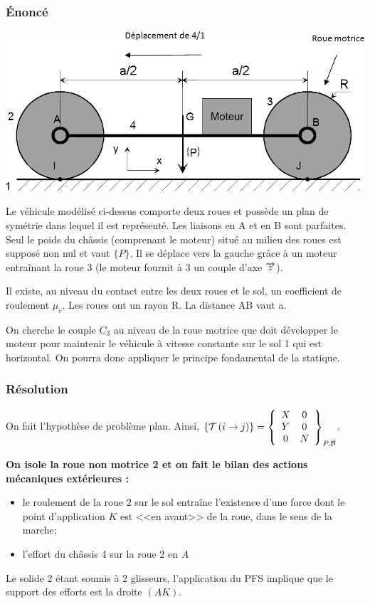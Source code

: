 \documentclass[10pt]{article}
\begin{document}
\subsubsection{Énoncé}
\begin{center}
\includegraphics[width=.6\textwidth]{images/roule_04}
\end{center}


Le véhicule modélisé ci-dessus comporte deux roues et possède un plan de symétrie dans lequel il est représenté. Les liaisons en A et en B sont parfaites. Seul le poids du châssis (comprenant le moteur) situé au milieu des roues est supposé non nul et vaut $\{P\}$. Il se déplace vers la gauche grâce à un moteur entraînant la roue 3 (le moteur fournit à 3 un couple d'axe $\vect{z}$).

Il existe, au niveau du contact entre les deux roues et le sol, un coefficient de roulement $\mu_r$. Les roues ont un rayon R. La distance AB vaut a.

On cherche le couple $C_3$ au niveau de la roue motrice que doit développer le moteur pour maintenir le véhicule à vitesse constante sur le sol 1 qui est horizontal. On pourra donc appliquer le principe fondamental de la statique.

\subsubsection{Résolution}

On fait l'hypothèse de problème plan. Ainsi, $\torseurstat{T}{i}{j}=\torseurcol{X}{Y}{0}{0}{0}{N}{P,\mathcal{B}}$.

\textbf{On isole la roue non motrice 2 et on fait le bilan des actions mécaniques extérieures :}
\begin{itemize}
\item le roulement de la roue 2 sur le sol entraîne l'existence d'une force dont le point d'application $K$ est <<en avant>> de la roue, dans le sens de la marche;
\item l'effort du châssis 4 sur la roue 2 en $A$
\end{itemize}

Le solide 2 étant soumis à 2 glisseurs, l'application du PFS implique que le support des efforts est la droite $(AK)$.
\end{document}
